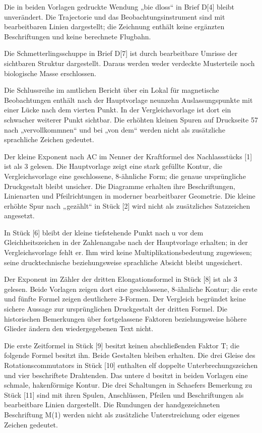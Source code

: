 Die in beiden Vorlagen gedruckte Wendung „bie dloss“ in Brief D[4] bleibt unverändert. Die Trajectorie und das Beobachtungsinstrument sind mit bearbeitbaren Linien dargestellt; die Zeichnung enthält keine ergänzten Beschriftungen und keine berechnete Flugbahn.

Die Schmetterlingsschuppe in Brief D[7] ist durch bearbeitbare Umrisse der sichtbaren Struktur dargestellt. Daraus werden weder verdeckte Musterteile noch biologische Masse erschlossen.

Die Schlussreihe im amtlichen Bericht über ein Lokal für magnetische Beobachtungen enthält nach der Hauptvorlage neunzehn Auslassungspunkte mit einer Lücke nach dem vierten Punkt. In der Vergleichsvorlage ist dort ein schwacher weiterer Punkt sichtbar. Die erhöhten kleinen Spuren auf Druckseite 57 nach „vervollkommnen“ und bei „von dem“ werden nicht als zusätzliche sprachliche Zeichen gedeutet.

Der kleine Exponent nach AC im Nenner der Kraftformel des Nachlassstücks [1] ist als 3 gelesen. Die Hauptvorlage zeigt eine stark gefüllte Kontur, die Vergleichsvorlage eine geschlossene, 8-ähnliche Form; die genaue ursprüngliche Druckgestalt bleibt unsicher. Die Diagramme erhalten ihre Beschriftungen, Linienarten und Pfeilrichtungen in moderner bearbeitbarer Geometrie. Die kleine erhöhte Spur nach „gezählt“ in Stück [2] wird nicht als zusätzliches Satzzeichen angesetzt.

In Stück [6] bleibt der kleine tiefstehende Punkt nach u vor dem Gleichheitszeichen in der Zahlenangabe nach der Hauptvorlage erhalten; in der Vergleichsvorlage fehlt er. Ihm wird keine Multiplikationsbedeutung zugewiesen; seine drucktechnische beziehungsweise sprachliche Absicht bleibt ungesichert.

Der Exponent im Zähler der dritten Elongationsformel in Stück [8] ist als 3 gelesen. Beide Vorlagen zeigen dort eine geschlossene, 8-ähnliche Kontur; die erste und fünfte Formel zeigen deutlichere 3-Formen. Der Vergleich begründet keine sichere Aussage zur ursprünglichen Druckgestalt der dritten Formel. Die historischen Bemerkungen über fortgelassene Faktoren beziehungsweise höhere Glieder ändern den wiedergegebenen Text nicht.

Die erste Zeitformel in Stück [9] besitzt keinen abschließenden Faktor T; die folgende Formel besitzt ihn. Beide Gestalten bleiben erhalten. Die drei Gleise des Rotationscommutators in Stück [10] enthalten elf doppelte Unterbrechungszeichen und vier beschriftete Drahtenden. Das untere d besitzt in beiden Vorlagen eine schmale, hakenförmige Kontur. Die drei Schaltungen in Schaefers Bemerkung zu Stück [11] sind mit ihren Spulen, Anschlüssen, Pfeilen und Beschriftungen als bearbeitbare Linien dargestellt. Die Rundungen der handgezeichneten Beschriftung M(1) werden nicht als zusätzliche Unterstreichung oder eigenes Zeichen gedeutet.


